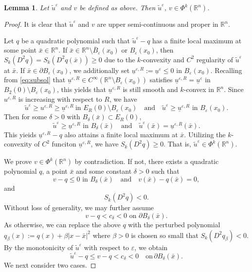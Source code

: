 \documentclass[reqno]{amsart}
\newtheorem{lemma}[theorem]{Lemma}
\theoremstyle{remark}
\theoremstyle{definition}
\numberwithin{equation}{section}
\begin{document}
\begin{lemma}\label{lem:Phi-k}
	Let $\tilde{u}^\varepsilon$ and $v$ be defined as above. Then $\tilde{u}^\varepsilon$, $v\in\Phi^k(\mathbb{R}^n)$.
\end{lemma}
\begin{proof}
	It is clear that $\tilde{u}^\varepsilon$ and $v$ are upper semi-continuous and proper in $\mathbb{R}^n$. 

	Let $q$ be a quadratic polynomial such that $\tilde{u}^\varepsilon-q$ has a finite local maximum at some point $\bar{x}\in\mathbb{R}^n  $. If $\bar{x}\in\mathbb{R}^n\setminus\bar{B}_\varepsilon(x_0)$ or $B_\varepsilon(x_0)$, then $S_k(D^2q)=S_k(D^2q(\bar{x}))\geq0$ due to the $k$-convexity and $C^2$ regularity of $\tilde{u}^\varepsilon$ at $\bar{x}$. If $\bar{x}\in\partial B_\varepsilon(x_0)$, we additionally set $\underline{u}^{\varepsilon,R}:=\underline{u}^\varepsilon\leq0$ in $B_\varepsilon(x_0)$. 
	Recalling from \eqref{eq:subsol} that $\underline{u}^{\varepsilon,R}\in C^{\infty}(\mathbb{R}^n\setminus B_\varepsilon(x_0))$ satisfies $\underline{u}^{\varepsilon,R}=\underline u^\varepsilon$ in $B_2(0)\setminus B_\varepsilon(x_0)$, this yields that $\underline{u}^{\varepsilon,R}$ is still smooth and $k$-convex in $\mathbb{R}^n$. Since $u^{\varepsilon,R}$ is increasing with respect to $R$, we have
	$$\tilde{u}^\varepsilon\geq u^{\varepsilon,R}\geq\underline{u}^{\varepsilon,R}\ \text{in }E_R(0)\setminus B_\varepsilon(x_0)\quad\text{and}\quad\tilde{u}^\varepsilon\geq\underline{u}^{\varepsilon,R}\text{ in }B_\varepsilon(x_0).$$ 
	Then for some $\delta>0$ with $B_\delta(\bar{x})\subset E_R(0)  $, 
	$$\tilde{u}^\varepsilon\geq\underline{u}^{\varepsilon,R}\text{ in }B_\delta(\bar{x})\quad\text{and}\quad\tilde{u}^\varepsilon(\bar{x})=\underline{u}^{\varepsilon,R}(\bar{x}).$$
	This yieids $\underline{u}^{\varepsilon,R}-q$ also attains a finite local maximum at $\bar{x}$. Utilizing the $k$-convexity of $C^2$ funciton $\underline{u}^{\varepsilon,R}$, we have $S_k(D^2q)\geq0$. That is, $\tilde{u}^\varepsilon\in\Phi^k(\mathbb{R}^n)$.
	
	We prove $v\in\Phi^k(\mathbb{R}^n)$ by contradiction. If not, there exists a quadratic polynomial $q$, a point $\bar{x}$ and some constant $\delta>0$ such that
	\[v-q\leq0 \text{ in }B_\delta(\bar{x})\quad\text{and}\quad v(\bar{x})-q(\bar{x})=0,\]
	and
	\[S_k(D^2q)<0.\]
	Without loss of generality, we may further assume
	\[
	v - q < c_\delta < 0 \text{ on } \partial B_\delta(\bar{x}). 
	\]
	As otherwise, we can replace the above $q$ with the perturbed polynomial \(q_\beta(x):= q(x) + \beta|x - \bar{x}|^2\) where \(\beta > 0\) is chosen so small that \(S_k(D^2q_\beta) < 0\). By the monotonicity of $\tilde{u}^\varepsilon$ with respect to $\varepsilon$, we obtain 
	\begin{equation}\label{eq:u-q}
		\tilde{u}^\varepsilon - q \leq v - q < c_\delta < 0 \quad \text{on} \, \partial B_\delta(\bar{x}).
	\end{equation} 
	We next consider two cases.


\end{proof}
\end{document}
